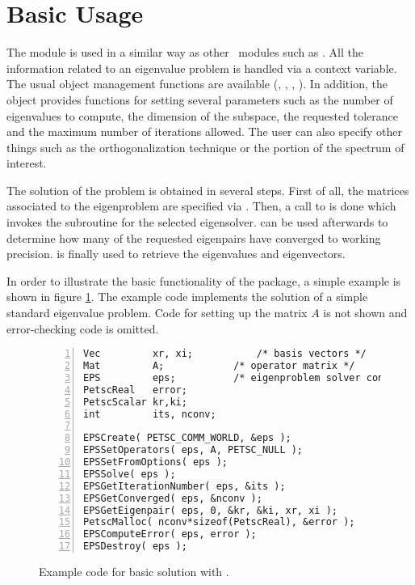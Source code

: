 \section{Basic Usage}

	The  module is used in a similar way as other \petsc\ modules such as . All the information related to an eigenvalue problem is handled via a context variable. The usual object management functions are available (, , , ). In addition, the  object provides functions for setting several parameters such as the number of eigenvalues to compute, the dimension of the subspace, the requested tolerance and the maximum number of iterations allowed. The user can also specify other things such as the orthogonalization technique or the portion of the spectrum of interest.

	The solution of the problem is obtained in several steps. First of all, the matrices associated to the eigenproblem are specified via . Then, a call to  is done which invokes the subroutine for the selected eigensolver.  can be used afterwards to determine how many of the requested eigenpairs have converged to working precision.  is finally used to retrieve the eigenvalues and eigenvectors. 

	In order to illustrate the basic functionality of the  package, a simple example is shown in figure \ref{fig:ex-eps}. The example code implements the solution of a simple standard eigenvalue problem. Code for setting up the matrix $A$ is not shown and error-checking code is omitted.

\begin{figure}[t]
\begin{Verbatim}[fontsize=\small,numbers=left,numbersep=6pt,xleftmargin=15mm]
Vec         xr, xi;           /* basis vectors */
Mat         A;            /* operator matrix */
EPS         eps;          /* eigenproblem solver context */
PetscReal   error;
PetscScalar kr,ki;
int         its, nconv;

EPSCreate( PETSC_COMM_WORLD, &eps );
EPSSetOperators( eps, A, PETSC_NULL );
EPSSetFromOptions( eps );
EPSSolve( eps );
EPSGetIterationNumber( eps, &its );
EPSGetConverged( eps, &nconv );
EPSGetEigenpair( eps, 0, &kr, &ki, xr, xi );
PetscMalloc( nconv*sizeof(PetscReal), &error );
EPSComputeError( eps, error );
EPSDestroy( eps );
\end{Verbatim}
\caption{\label{fig:ex-eps}Example code for basic solution with .}
\end{figure}

